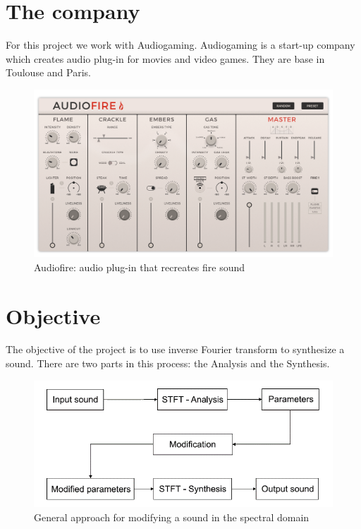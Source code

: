 \documentclass[]{article}
\begin{document}
\section{The company}\label{sec:the-company}
For this project we work with Audiogaming. Audiogaming is a start-up company which creates audio
plug-in for movies and video games. They are base in Toulouse and Paris.
\begin{figure}[H]
	\centering
	\includegraphics[scale=0.19]{AudioFire_screen.png}
	\caption{Audiofire: audio plug-in that recreates fire sound}
\end{figure}

\section{Objective}\label{sec:objective}

The objective of the project is to use
inverse Fourier transform to synthesize a sound. There are two
parts in this process: the Analysis and the Synthesis.
	\begin{figure}[H]
		\centering
		\includegraphics[scale=0.4]{Analysis_Synthesis.png}
		\caption{General approach for modifying a sound in the spectral domain}
	\end{figure}
\end{document}
